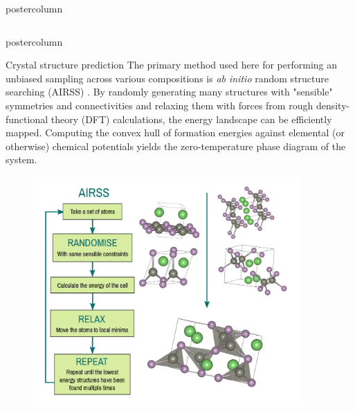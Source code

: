 \documentclass{beamer}
\begin{document}
\begin{frame}
\begin{columns}
\begin{column}{.65\textwidth}
\begin{beamercolorbox}[center]{postercolumn}
\begin{minipage}{.98\textwidth}
{\begin{columns}
\begin{column}{.48\textwidth}
\begin{beamercolorbox}[right]{postercolumn}
\begin{minipage}{\textwidth}
{\begin{myblock}{Crystal structure prediction}
              The primary method used here for performing an unbiased sampling across various compositions is \emph{ab initio} random structure searching (AIRSS) \cite{Pickard2011}. By randomly generating many structures with "sensible" symmetries and connectivities and relaxing them with forces from rough density-functional theory (DFT) calculations, the energy landscape can be efficiently mapped. Computing the convex hull of formation energies against elemental (or otherwise) chemical potentials yields the zero-temperature phase diagram of the system.
            \begin{figure}
                \centering
              \includegraphics[width=0.9\textwidth]{img/airss.png}
          \end{figure}
              

\end{myblock}}
\end{minipage}
\end{beamercolorbox}
\end{column}
\end{columns}}
\end{minipage}
\end{beamercolorbox}
\end{column}
\end{columns}
\end{frame}
\end{document}
